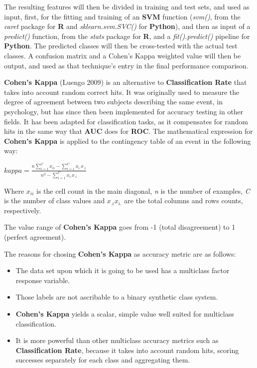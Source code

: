 \documentclass[]{article}
\begin{document}
The resulting features will then be divided in training and test sets,
and used as input, first, for the fitting and training of an
\textbf{SVM} function (\emph{svm()}, from the \emph{caret} package for
\textbf{R} and \emph{sklearn.svm.SVC()} for \textbf{Python}), and then
as input of a \emph{predict()} function, from the \emph{stats} package
for \textbf{R}, and a \emph{fit().predict()} pipeline for
\textbf{Python}. The predicted classes will then be cross-tested with
the actual test classes. A confusion matrix and a Cohen's Kappa weighted
value will then be output, and used as that technique's entry in the
final performance comparison.

\textbf{Cohen's Kappa} (Luengo 2009) is an alternative to
\textbf{Classification Rate} that takes into account random correct
hits. It was originally used to measure the degree of agreement between
two subjects describing the same event, in psychology, but has since
then been implemented for accuracy testing in other fields. It has been
adapted for classification tasks, as it compensates for random hits in
the same way that \textbf{AUC} does for \textbf{ROC}. The mathematical
expression for \textbf{Cohen's Kappa} is applied to the contingency
table of an event in the following way:

\(kappa = \frac{n \sum_{i=1}^C x_{ii} - \sum_{i=1}^C x_{i.}x_{.i}}{n^2 - \sum_{i=1}^C x_{i.}x_{.i}}\)

Where \(x_{ii}\) is the cell count in the main diagonal, \emph{n} is the
number of examples, \emph{C} is the number of class values and
\(x_{.i}x_{i.}\) are the total columns and rows counts, respectively.

The value range of \textbf{Cohen's Kappa} goes from -1 (total
disagreement) to 1 (perfect agreement).

The reasons for chosing \textbf{Cohen's Kappa} as accuracy metric are as
follows:

\begin{itemize}
\itemsep1pt\parskip0pt
\item
  The data set upon which it is going to be used has a multiclass factor
  response variable.\\
\item
  Those labels are not ascribable to a binary synthetic class system.\\
\item
  \textbf{Cohen's Kappa} yields a scalar, simple value well suited for
  multiclass classification.\\
\item
  It is more powerful than other multiclass accuracy metrics such as
  \textbf{Classification Rate}, because it takes into account random
  hits, scoring successes separately for each class and aggregating
  them.
\end{itemize}
\end{document}

